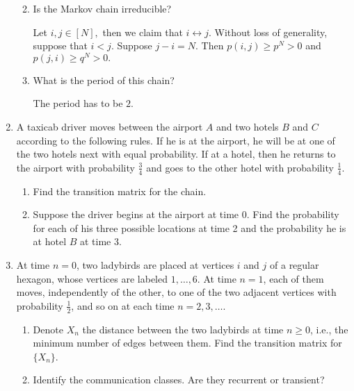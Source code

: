 \documentclass[10pt, oneside]{article}
\theoremstyle{definition}
\begin{document}
\begin{enumerate}
\begin{enumerate}
\begin{solution}
\begin{center}
\end{center}            
        \end{solution}
        \item Is the Markov chain irreducible? 
        \begin{solution}
Let $i,j \in [N],$ then we claim that $i \leftrightarrow j.$ Without loss of generality, suppose that $i < j.$ Suppose $j-i = N.$ Then $p(i,j)\geq p^N >0$ and $p(j,i) \geq q^N >0.$
        \end{solution}
        \item What is the period of this chain? 
        \begin{solution}
            The period has to be $2.$
        \end{solution}
    \end{enumerate}

    \item A taxicab driver moves between the airport $A$ and two hotels $B$ and $C$ according to the following rules. If he is at the airport, he will be at one of the two hotels next with equal probability. If at a hotel, then he returns to the airport with probability $\frac{3}{4}$ and goes to the other hotel with probability $\frac{1}{4}$.
    \begin{enumerate}
        \item Find the transition matrix for the chain.
        \item Suppose the driver begins at the airport at time 0. Find the probability for each of his three possible locations at time 2 and the probability he is at hotel $B$ at time 3.
    \end{enumerate}

    \item At time $n = 0$, two ladybirds are placed at vertices $i$ and $j$ of a regular hexagon, whose vertices are labeled $1, \dots, 6$. At time $n = 1$, each of them moves, independently of the other, to one of the two adjacent vertices with probability $\frac{1}{2}$, and so on at each time $n = 2, 3, \dots$.
    \begin{enumerate}
        \item Denote $X_n$ the distance between the two ladybirds at time $n \geq 0$, i.e., the minimum number of edges between them. Find the transition matrix for $\{X_n\}$.
        \item Identify the communication classes. Are they recurrent or transient?
    \end{enumerate}


\end{enumerate}
\end{document}

